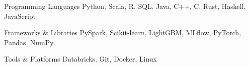 

\begin{cvskills}

  \cvskill
    {Programming Languages} %
    {Python, Scala, R, SQL, Java, C++, C, Rust, Haskell, JavaScript} %

  \cvskill
    {Frameworks \& Libraries} %
    {PySpark, Scikit-learn, LightGBM, MLflow, PyTorch, Pandas, NumPy} %

  \cvskill
    {Tools \& Platforms} %
    {Databricks, Git, Docker, Linux} %

\end{cvskills}
